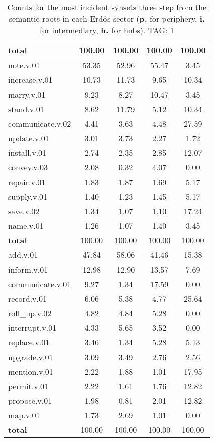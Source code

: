 \begin{table}[h!]
\begin{center}
\begin{tabular}{| l || c | c | c | c |}
{{\bf total}} & 100.00  & 100.00  & 100.00  & 100.00 \\\hline\hline\hline
note.v.01 & 53.35  & 52.96  & 55.47  & 3.45 \\\hline
increase.v.01 & 10.73  & 11.73  & 9.65  & 10.34 \\\hline
marry.v.01 & 9.23  & 8.27  & 10.47  & 3.45 \\\hline
stand.v.01 & 8.62  & 11.79  & 5.12  & 10.34 \\\hline
communicate.v.02 & 4.41  & 3.63  & 4.48  & 27.59 \\\hline
update.v.01 & 3.01  & 3.73  & 2.27  & 1.72 \\\hline
install.v.01 & 2.74  & 2.35  & 2.85  & 12.07 \\\hline
convey.v.03 & 2.08  & 0.32  & 4.07  & 0.00 \\\hline
repair.v.01 & 1.83  & 1.87  & 1.69  & 5.17 \\\hline
supply.v.01 & 1.40  & 1.23  & 1.45  & 5.17 \\\hline
save.v.02 & 1.34  & 1.07  & 1.10  & 17.24 \\\hline
name.v.01 & 1.26  & 1.07  & 1.40  & 3.45 \\\hline\hline
{{\bf total}} & 100.00  & 100.00  & 100.00  & 100.00 \\\hline\hline\hline
add.v.01 & 47.84  & 58.06  & 41.46  & 15.38 \\\hline
inform.v.01 & 12.98  & 12.90  & 13.57  & 7.69 \\\hline
communicate.v.01 & 9.27  & 1.34  & 17.59  & 0.00 \\\hline
record.v.01 & 6.06  & 5.38  & 4.77  & 25.64 \\\hline
roll\_up.v.02 & 4.82  & 4.84  & 5.28  & 0.00 \\\hline
interrupt.v.01 & 4.33  & 5.65  & 3.52  & 0.00 \\\hline
replace.v.01 & 3.46  & 1.34  & 5.28  & 5.13 \\\hline
upgrade.v.01 & 3.09  & 3.49  & 2.76  & 2.56 \\\hline
mention.v.01 & 2.22  & 1.88  & 1.01  & 17.95 \\\hline
permit.v.01 & 2.22  & 1.61  & 1.76  & 12.82 \\\hline
propose.v.01 & 1.98  & 0.81  & 2.01  & 12.82 \\\hline
map.v.01 & 1.73  & 2.69  & 1.01  & 0.00 \\\hline\hline
{{\bf total}} & 100.00  & 100.00  & 100.00  & 100.00 \\\hline
\end{tabular}
\caption{Counts for the most incident synsets three step from the semantic roots in each Erd\"os sector ({\bf p.} for periphery, {\bf i.} for intermediary, {\bf h.} for hubs). TAG: 1}
\end{center}
\end{table}